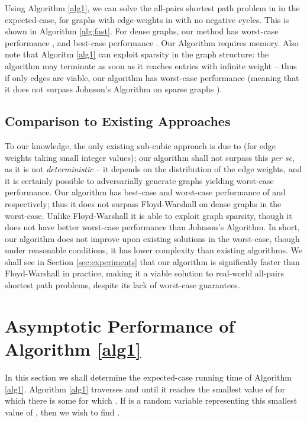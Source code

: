\documentclass[a4paper,10pt]{article}
\begin{document}
Using Algorithm \ref{alg1}, we can solve the all-pairs shortest path problem in  in the expected-case, for graphs with edge-weights in  with no negative cycles. This is shown in Algorithm \ref{alg:fast}. For dense graphs, our method has worst-case performance , and best-case performance . Our Algorithm requires  memory. Also note that Algoritm \ref{alg1} can exploit sparsity in the graph structure: the algorithm may terminate as soon as it reaches entries with infinite weight -- thus if only  edges are viable, our algorithm has worst-case performance  (meaning that it does not surpass Johnson's Algorithm on sparse graphs \cite{johnson}).

\subsection{Comparison to Existing Approaches}

To our knowledge, the only existing sub-cubic approach is due to \cite{allpsp} (for edge weights taking small integer values); our algorithm shall not surpass this \emph{per se}, as it is not \emph{deterministic} -- it depends on the distribution of the edge weights, and it is certainly possible to adversarially generate graphs yielding worst-case performance. Our algorithm has best-case and worst-case performance of  and  respectively; thus it does not surpass Floyd-Warshall on dense graphs in the worst-case. Unlike Floyd-Warshall it is able to exploit graph sparsity, though it does not have better worst-case performance than Johnson's Algorithm. In short, our algorithm does not improve upon existing solutions in the worst-case, though under reasonable conditions, it has lower complexity than existing algorithms. We shall see in Section \ref{sec:experiments} that our algorithm is significatly faster than Floyd-Warshall in practice, making it a viable solution to real-world all-pairs shortest path problems, despite its lack of worst-case guarantees.

\section{Asymptotic Performance of Algorithm \ref{alg1}}
\label{sec:analysis}

In this section we shall determine the expected-case running time of Algorithm \ref{alg1}. Algorithm \ref{alg1} traverses  and  until it reaches the smallest value of  for which there is some  for which . If  is a random variable representing this smallest value of , then we wish to find .
\end{document}
